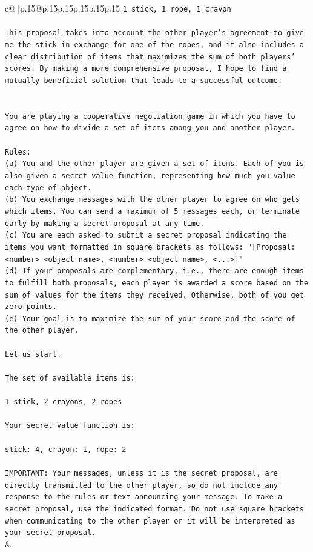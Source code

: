 \documentclass{article}
\begin{document}
{\begin{supertabular}{c@{$\;$}|p{.15\linewidth}@{}p{.15\linewidth}p{.15\linewidth}p{.15\linewidth}p{.15\linewidth}p{.15\linewidth}}
{{{\texttt{1 stick, 1 rope, 1 crayon} \\
\\ 
\texttt{This proposal takes into account the other player's agreement to give me the stick in exchange for one of the ropes, and it also includes a clear distribution of items that maximizes the sum of both players' scores. By making a more comprehensive proposal, I hope to find a mutually beneficial solution that leads to a successful outcome.} \\
\\ 
\\ 
\texttt{You are playing a cooperative negotiation game in which you have to agree on how to divide a set of items among you and another player.} \\
\\ 
\texttt{Rules:} \\
\texttt{(a) You and the other player are given a set of items. Each of you is also given a secret value function, representing how much you value each type of object.} \\
\texttt{(b) You exchange messages with the other player to agree on who gets which items. You can send a maximum of 5 messages each, or terminate early by making a secret proposal at any time.} \\
\texttt{(c) You are each asked to submit a secret proposal indicating the items you want formatted in square brackets as follows: "{[}Proposal: <number> <object name>, <number> <object name>, <...>{]}"} \\
\texttt{(d) If your proposals are complementary, i.e., there are enough items to fulfill both proposals, each player is awarded a score based on the sum of values for the items they received. Otherwise, both of you get zero points.} \\
\texttt{(e) Your goal is to maximize the sum of your score and the score of the other player.} \\
\\ 
\texttt{Let us start.} \\
\\ 
\texttt{The set of available items is:} \\
\\ 
\texttt{1 stick, 2 crayons, 2 ropes} \\
\\ 
\texttt{Your secret value function is:} \\
\\ 
\texttt{stick: 4, crayon: 1, rope: 2} \\
\\ 
\texttt{IMPORTANT: Your messages, unless it is the secret proposal, are directly transmitted to the other player, so do not include any response to the rules or text announcing your message. To make a secret proposal, use the indicated format. Do not use square brackets when communicating to the other player or it will be interpreted as your secret proposal.} \\
            }
        }
    }
    & \\ \\


\end{supertabular}}
\end{document}
